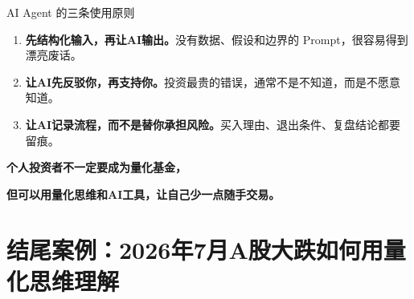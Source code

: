 \documentclass[UTF8,aspectratio=169,11pt]{ctexbeamer}
\begin{document}
\begin{frame}{AI Agent 的三条使用原则}
\begin{enumerate}
\item \textbf{先结构化输入，再让AI输出。}\quad 没有数据、假设和边界的 Prompt，很容易得到漂亮废话。
\item \textbf{让AI先反驳你，再支持你。}\quad 投资最贵的错误，通常不是不知道，而是不愿意知道。
\item \textbf{让AI记录流程，而不是替你承担风险。}\quad 买入理由、退出条件、复盘结论都要留痕。
\end{enumerate}
\vspace{0.35cm}
\begin{center}
\Large \textbf{个人投资者不一定要成为量化基金，}\par
\Large \textbf{但可以用量化思维和AI工具，让自己少一点随手交易。}
\end{center}
\end{frame}


\section{结尾案例：2026年7月A股大跌如何用量化思维理解}
\end{document}
